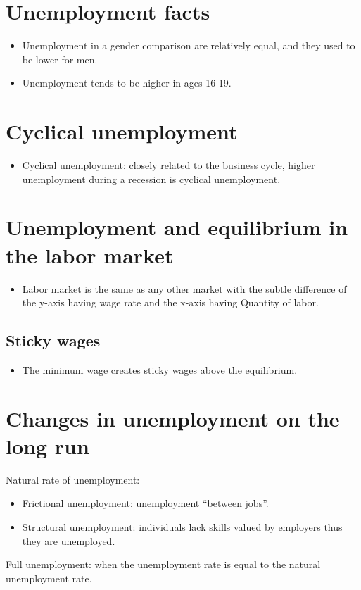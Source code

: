\documentclass[openany]{book}
\begin{document}
\section{Unemployment facts}
\begin{itemize}
    \item Unemployment in a gender comparison are relatively equal, and they used to be lower for men. 
    \item Unemployment tends to be higher in ages 16-19.
\end{itemize}


\section{Cyclical unemployment}
\begin{itemize}
    \item Cyclical unemployment: closely related to the business cycle, higher unemployment during a recession is cyclical unemployment. 
\end{itemize}


\section{Unemployment and equilibrium in the labor market}
\begin{itemize}
    \item Labor market is the same as any other market with the subtle difference of the y-axis having wage rate and the x-axis having Quantity of labor. 
\end{itemize}

\subsection{Sticky wages}
\begin{itemize}
    \item The minimum wage creates sticky wages above the equilibrium. 
\end{itemize}


\section{Changes in unemployment on the long run}
Natural rate of unemployment: 
\begin{itemize}
    \item Frictional unemployment: unemployment ``between jobs''.
    \item Structural unemployment: individuals lack skills valued by employers thus they are unemployed. 
\end{itemize}
Full unemployment: when the unemployment rate is equal to the natural unemployment rate. 
\end{document}

